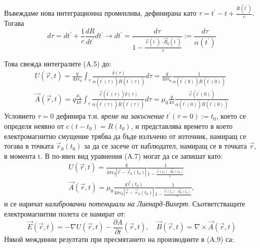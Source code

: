 \begin{appendices}
	Въвеждаме нова интеграционна променлива, дефинирана като $\tau = t^\prime - t + \frac{R(t^\prime)}{c}$. Тогава
	\begin{equation}
		d\tau = dt^\prime + \frac{1}{c}\frac{dR}{dt^\prime}dt^\prime\rightarrow dt^\prime = \frac{d\tau}{1 - \frac{\vec{v}(t^\prime)\cdot\vec{R}_0(t^\prime)}{c}} := \frac{d\tau}{\alpha(t^\prime)}
	\end{equation}
	
	Това свежда интегралите (A.5) до:
	\begin{equation}
		\begin{split}
		U(\vec{r},t) = \frac{q}{4\pi\epsilon_0}\int_\tau \frac{\delta(\tau)}{\alpha(t^\prime(\tau))R(t^\prime(\tau))}d\tau =\frac{q}{4\pi\epsilon_0} \frac{1}{\alpha(t^\prime(0))R(t^\prime(0))}\\
		\vec{A}(\vec{r},t) = q\frac{\mu_0}{4\pi}\int_\tau \frac{\vec{v}(t^\prime(\tau))\delta(\tau)}{\alpha(t^\prime(\tau))R(t^\prime(\tau))}d\tau=\mu_0\frac{q}{4\pi} \frac{\vec{v}(t^\prime(0))}{\alpha(t^\prime(0))R(t^\prime(0))}
		\end{split}
	\end{equation}
	Условието $\tau = 0$ дефинира т.н. \emph{време на закъснение} $t^\prime(\tau = 0) := t_0$, което се определя неявно от $c(t - t_0) = R(t_0)$, и представлява времето в което електромагнитно смущение трябва да бъде излъчено от източник, намиращ се тогава в точката $\vec{r}_0(t_0)$ за да се засече от наблюдател, намиращ се в точката $\vec{r}$, в момента t. В по-явен вид уравнения (A.7) могат да се запишат като:
		\begin{equation}
		\begin{split}
			U(\vec{r},t) = \frac{q}{4\pi\epsilon_0 |\vec{r} - \vec{r}_0(t_0)|} \frac{1}{1 - \frac{\vec{v}(t_0)\cdot \vec{R}_0(t_0)}{c}}\\
			\vec{A}(\vec{r},t) = \mu_0\frac{q\vec{v}(t_0)}{4\pi\epsilon_0 |\vec{r} - \vec{r}_0(t_0)|} \frac{1}{1 - \frac{\vec{v}(t_0)\cdot \vec{R}_0(t_0)}{c}},
		\end{split}
	\end{equation}
	и се наричат \emph{калибровачни потенциали на Лиенард-Вихерт}. Съответстващите електромагнитни полета се намират от:
	\begin{equation}
		\vec{E}(\vec{r},t) = -\nabla U(\vec{r},t) - \frac{\partial A}{\partial t}(\vec{r},t),\quad \vec{B}(\vec{r},t) = \nabla\times \vec{A}(\vec{r},t)
	\end{equation}
	Някой междинни резултати при пресмятането на производните в (A.9) са:
	\begin{equation}

\end{equation}
\end{appendices}
